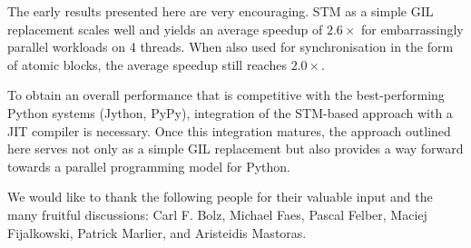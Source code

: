 \documentclass{sigplanconf}
\begin{document}
The early results presented here are very encouraging. STM as a simple
GIL replacement scales well and yields an average speedup of $2.6\times$ for
embarrassingly parallel workloads on 4 threads.  When also used for
synchronisation in the form of atomic blocks, the average speedup
still reaches $2.0\times$.

To obtain an overall performance that is competitive with the
best-performing Python systems (Jython, PyPy), integration of the
STM-based approach with a JIT compiler is necessary. Once this
integration matures, the approach outlined here serves not only as a
simple GIL replacement but also provides a way forward towards
a parallel programming model for Python.



\acks
We would like to thank the following people for their valuable
input and the many fruitful discussions: Carl F. Bolz, Michael Faes,
Pascal Felber, Maciej Fijalkowski, Patrick Marlier, and Aristeidis Mastoras.




\end{document}
